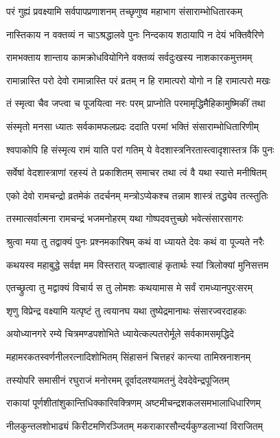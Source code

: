 \twolineshloka
{परं गुह्यं प्रवक्ष्यामि सर्वपापप्रणाशनम्}
{तच्छृणुष्व महाभाग संसाराम्भोधितारकम्}%

\twolineshloka
{नास्तिकाय न वक्तव्यं न चाऽश्रद्धालवे पुनः}
{निन्दकाय शठायापि न देयं भक्तिवैरिणे}%

\twolineshloka
{रामभक्ताय शान्ताय कामक्रोधवियोगिने}
{वक्तव्यं सर्वदुःखस्य नाशकारकमुत्तमम्}%

\twolineshloka
{रामान्नास्ति परो देवो रामान्नास्ति परं व्रतम्}
{न हि रामात्परो योगो न हि रामात्परो मखः}%

\twolineshloka
{तं स्मृत्वा चैव जप्त्वा च पूजयित्वा नरः परम्}
{प्राप्नोति परमामृद्धिमैहिकामुष्मिकीं तथा}%

\twolineshloka
{संस्मृतो मनसा ध्यातः सर्वकामफलप्रदः}
{ददाति परमां भक्तिं संसाराम्भोधितारिणीम्}%

\twolineshloka
{श्वपाकोपि हि संस्मृत्य रामं याति परां गतिम्}
{ये वेदशास्त्रनिरतास्त्वादृशास्तत्र किं पुनः}%

\twolineshloka
{सर्वेषां वेदशास्त्राणां रहस्यं ते प्रकाशितम्}
{समाचर तथा त्वं वै यथा स्यात्ते मनीषितम्}%

\twolineshloka
{एको देवो रामचन्द्रो व्रतमेकं तदर्चनम्}
{मन्त्रोऽप्येकश्च तन्नाम शास्त्रं तद्ध्येव तत्स्तुतिः}%

\twolineshloka
{तस्मात्सर्वात्मना रामचन्द्रं भजमनोहरम्}
{यथा गोष्पदवत्तुच्छो भवेत्संसारसागरः}%

\twolineshloka
{श्रुत्वा मया तु तद्वाक्यं पुनः प्रश्नमकारिषम्}
{कथं वा ध्यायते देवः कथं वा पूज्यते नरैः}%

\twolineshloka
{कथयस्व महाबुद्धे सर्वज्ञ मम विस्तरात्}
{यज्ज्ञात्वाहं कृतार्थः स्यां त्रिलोक्यां मुनिसत्तम}%

\twolineshloka
{एतच्छ्रुत्वा तु मद्वाक्यं विचार्य स तु लोमशः}
{कथयामास मे सर्वं रामध्यानपुरःसरम्}%

\twolineshloka
{शृणु विप्रेन्द्र वक्ष्यामि यत्पृष्टं तु त्वयानघ}
{यथा तुष्येद्रमानाथः संसारज्वरदाहकः}%

\twolineshloka
{अयोध्यानगरे रम्ये चित्रमण्डपशोभिते}
{ध्यायेत्कल्पतरोर्मूले सर्वकामसमृद्धिदे}%

\twolineshloka
{महामरकतस्वर्णनीलरत्नादिशोभितम्}
{सिंहासनं चित्तहरं कान्त्या तामिस्रनाशनम्}%

\twolineshloka
{तस्योपरि समासीनं रघुराजं मनोरमम्}
{दूर्वादलश्यामतनुं देवदेवेन्द्रपूजितम्}%

\twolineshloka
{राकायां पूर्णशीतांशुकान्तिधिक्कारिवक्त्रिणम्}
{अष्टमीचन्द्रशकलसमभालाधिधारिणम्}%

\twolineshloka
{नीलकुन्तलशोभाढ्यं किरीटमणिरञ्जितम्}
{मकराकारसौन्दर्यकुण्डलाभ्यां विराजितम्}%

